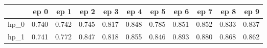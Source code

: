 \begin{tabular}{lrrrrrrrrrr}
\toprule
{} &   ep 0 &   ep 1 &   ep 2 &   ep 3 &   ep 4 &   ep 5 &   ep 6 &   ep 7 &   ep 8 &   ep 9 \\
\midrule
hp\_0 &  0.740 &  0.742 &  0.745 &  0.817 &  0.848 &  0.785 &  0.851 &  0.852 &  0.833 &  0.837 \\
hp\_1 &  0.741 &  0.772 &  0.847 &  0.818 &  0.855 &  0.846 &  0.893 &  0.880 &  0.868 &  0.862 \\
\bottomrule
\end{tabular}
